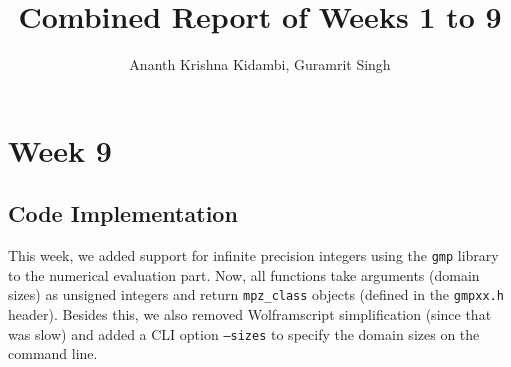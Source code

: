 \documentclass[12pt]{report}
\title{Combined Report of Weeks 1 to 9}
\author{Ananth Krishna Kidambi, Guramrit Singh}
\begin{document}
    \maketitle
    \tableofcontents
    \chapter*{Week 9}
    \section*{Code Implementation}
    This week, we added support for infinite precision integers using the \texttt{gmp} library to the numerical evaluation part. Now, all functions take arguments (domain sizes) as unsigned integers and return \texttt{mpz\_class} objects (defined in the \texttt{gmpxx.h} header). 
	Besides this, we also removed Wolframscript simplification (since that was slow) and added a CLI option \texttt{--sizes} to specify the domain sizes on the command line. 
\end{document}
